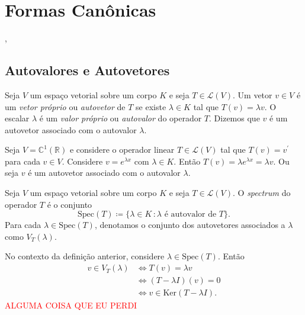 \documentclass[11pt,twoside,a4paper]{book}
\begin{document}
\chapter{Formas Canônicas}
,\section{Autovalores e Autovetores}
 \begin{definicao}
Seja \(V\) um espaço vetorial sobre um corpo \(K\) e seja \(T\in\mathcal{L}(V)\). Um vetor 
\(v\in V\) é um \emph{vetor próprio} ou \emph{autovetor} de \(T\) se existe \(\lambda\in K\) tal que \(T(v)=\lambda v\). O escalar \(\lambda\) é um \emph{valor próprio} ou \emph{autovalor} do operador \(T\). Dizemos que \(v\) é um autovetor associado com o autovalor \(\lambda\).
\end{definicao}
\begin{exemplo}
Seja \(V=\mathbb{C}^1(\mathbb{R})\) e considere o operador linear \(T\in\mathcal{L}(V)\) tal que \(T(v)=v^\prime\) para cada \(v\in V\). Considere \(v=e^{\lambda x}\) com \(\lambda\in K\). Então \(T(v)=\lambda e^{\lambda x}=\lambda v\). Ou seja \(v\) é um autovetor associado com o autovalor \(\lambda\).
\end{exemplo}
\begin{definicao}
Seja \(V\) um espaço vetorial sobre um corpo \(K\) e seja \(T\in\mathcal{L}(V)\). O \emph{spectrum} do operador \(T\) é o conjunto
\[\text{Spec}(T)\coloneqq\{\lambda\in K\,\colon \lambda \text{ é autovalor de } T\}.\]
Para cada \(\lambda\in\text{Spec}(T)\), denotamos o conjunto dos autovetores associados a \(\lambda\) como \(V_T(\lambda)\).
\end{definicao}
 No contexto da definição anterior, considere
 \(\lambda\in\text{Spec}(T)\). Então
 \begin{align*}
    v\in V_T(\lambda)&\iff T(v)=\lambda v\\&\iff (T-\lambda I)(v)=0\\&\iff v\in\text{Ker}(T-\lambda I).
 \end{align*}
\textcolor{red}{ALGUMA COISA QUE EU PERDI}
\end{document}
